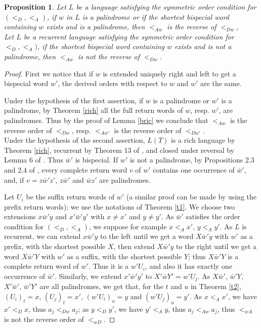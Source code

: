\documentclass[12pt,a4paper]{amsart}
\newtheorem{proposition}[theorem]{Proposition}
\begin{document}
\begin{proposition}\label{sym} 
Let $L$ be a language satisfying the symmetric order condition for $(<_D, <_A)$,  if $w$ in $L$ is a palindrome or if the shortest bispecial word containing $w$ exists and is a palindrome, then  $<_{Aw}$ is the reverse of $<_{Dw}$,\\
Let $L$ be a recurrent  language satisfying the symmetric order condition for  $<_D, <_A)$,  if the shortest bispecial word containing $w$ exists and is not a palindrome, then  $<_{Aw}$ is not the reverse of $<_{Dw}$.
 \end{proposition}
\begin{proof}
First we notice that if $w$ is extended uniquely  right and left to get a bispecial word $w'$, the derived orders with respect to $w$ and $w'$ are the same.

Under the hypothesis of the first assertion, if $w$ is a palindrome or $w'$ is a palindrome, by Theorem \ref{rich} all the full return words of $w$, resp. $w'$, are palindromes.  Thus by the proof of Lemma \ref{bric} we conclude that $<_{Aw}$ is the reverse order of $<_{Dw}$, resp. $<_{Aw'}$ is the reverse order of $<_{Dw'}$.\\

Under the hypothesis of the second assertion,  $L(T)$ is a rich language by Theorem \ref{rich}, recurrent by Theorem 13 of \cite{fhuz}, and closed under reversal by Lemma 6 of \cite{fz3}. Thus $\bar w'$ is bispecial.  If $w'$ is not a palindrome, by Propositions 2.3 and 2.4 of \cite{bdgz}, every complete return word $v$ of $w'$ 
contains one occurrence of $\bar w'$, and, if $v=z\bar w'z'$, $z\bar w'$ and $\bar wz'$ are palindromes.

 Let $U_i$ be the suffix return words of $w'$ (a similar proof can be made by using the prefix return words); we use the notations of Theorem \ref{t1}. 
We choose two extensions $x\bar w'y$ and $x'\bar w'y'$ with $x\neq x'$ and $y\neq y'$. As $\bar w'$ satisfies the order condition for $(<_D,<_A)$, we suppose for example $x<_A x'$, $y<_A y'$. As $L$ is recurrent, we can extend $x\bar w'y$ to
the left until we get a word $X\bar w'y$ with $w'$ as a prefix, with the shortest possible $X$, then  extend $X\bar w'y$ to
the right until we get a word $X\bar w'Y$ with $w'$ as a suffix, with the shortest possible $Y$; thus $X\bar w'Y$ is a complete return word of $w'$. Thus it is a $w'U_i$, and  also it has exactly one occurrence of $\bar w'$. Similarly, we extend $x'\bar w'y'$ to $X'\bar wY'=w'U_j$. As $X\bar w'$, $\bar w'Y$, $X'\bar w'$, $\bar w'Y'$ 
are all palindromes, we get that, for the $t$ and $u$ in Theorem \ref{t2},  $(U_i)_t=x$, $(U_j)_t=x'$, $(w'U_i)_u=y$ and $(w'U_j)_u=y'$. As $x<_A x'$, we have $x' <_D x$, thus $a_j <_{Dw}a_j$; as $y<_D y'$, we have $y' <_A y$, thus $a_j <_{Aw}a_j$, thus $<_{wA}$ is
 not the reverse order of $<_{wD}$.\end{proof}
 
\end{document}
